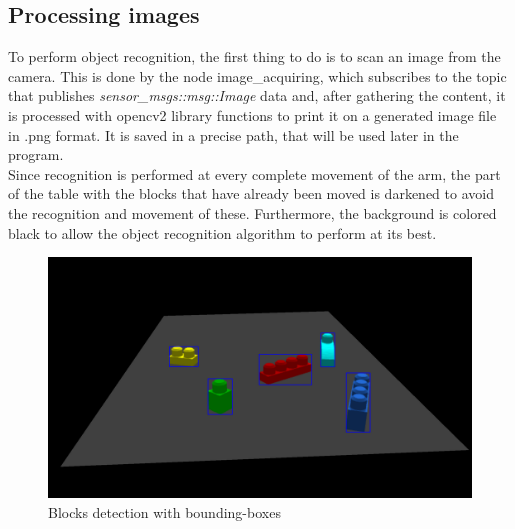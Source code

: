 \documentclass[12pt,a4paper]{article}
\begin{document}
\subsection{Processing images}\label{subsec:imageproc}
To perform object recognition, the first thing to do is to scan an image from the camera. This is done by the node image\_acquiring, which subscribes to the topic that publishes \textit{sensor\_msgs::msg::Image} data and, after gathering the content, it is processed with opencv2 library functions to print it on a generated image file in .png format. It is saved in a precise path, that will be used later in the program.\\Since recognition is performed at every complete movement of the arm, the part of the table with the blocks that have already been moved is darkened to avoid the recognition and movement of these. Furthermore, the background is colored black to allow the object recognition algorithm to perform at its best.
\begin{center}
    \begin{figure}
        \centering
        \includegraphics[width=1.0\columnwidth]{images/Yolo1.png}
        \caption{Blocks detection with bounding-boxes}
        \label{fig:yolo1}
    \end{figure}
\end{center}
\end{document}
